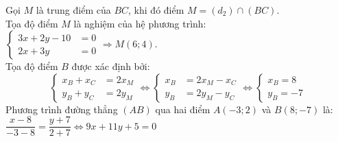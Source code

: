 \begin{bt}
{\begin{itemize}
			Gọi $M$ là trung điểm của $BC$, khi đó điểm $M=(d_2)\cap(BC)$.\\
			Tọa độ điểm $M$ là nghiệm của hệ phương trình: $\begin{cases}
			3x+2y-10&=0\\
			2x+3y&=0
			\end{cases} \Rightarrow M(6;4)$.\\
			Tọa độ điểm $B$ được xác định bởi:
			\[\begin{cases}
			x_B+x_C&=2x_M\\
			y_B+y_C&=2y_M
			\end{cases}
			\Leftrightarrow
			\begin{cases}
			x_B&=2x_M-x_C\\
			y_B&=2y_M-y_C
			\end{cases}
			\Leftrightarrow
			\begin{cases}
			x_B=8\\
			y_B=-7
			\end{cases}\]
			Phương trình đường thẳng $(AB)$ qua hai điểm $A(-3;2)$ và $B(8;-7)$ là:\\ $\dfrac{x-8}{-3-8}=\dfrac{y+7}{2+7}\Leftrightarrow 9x+11y+5=0$
	\end{itemize}}
\end{bt}
